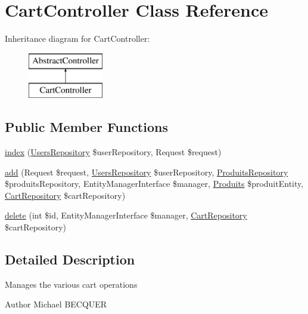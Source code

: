 \hypertarget{class_app_1_1_controller_1_1_cart_controller}{}\section{Cart\+Controller Class Reference}
\label{class_app_1_1_controller_1_1_cart_controller}
Inheritance diagram for Cart\+Controller\+:\begin{figure}[H]
\begin{center}
\leavevmode
\includegraphics[height=2.000000cm]{class_app_1_1_controller_1_1_cart_controller}
\end{center}
\end{figure}
\subsection*{Public Member Functions}
\begin{DoxyCompactItemize}
\item 
\mbox{\hyperlink{class_app_1_1_controller_1_1_cart_controller_acb4819cf06207b3c628edfa1a5af6a6f}{index}} (\mbox{\hyperlink{class_app_1_1_repository_1_1_users_repository}{Users\+Repository}} \$user\+Repository, Request \$request)
\item 
\mbox{\hyperlink{class_app_1_1_controller_1_1_cart_controller_ac217678855013811414d24f84ad9b57b}{add}} (Request \$request, \mbox{\hyperlink{class_app_1_1_repository_1_1_users_repository}{Users\+Repository}} \$user\+Repository, \mbox{\hyperlink{class_app_1_1_repository_1_1_produits_repository}{Produits\+Repository}} \$produits\+Repository, Entity\+Manager\+Interface \$manager, \mbox{\hyperlink{class_app_1_1_entity_1_1_produits}{Produits}} \$produit\+Entity, \mbox{\hyperlink{class_app_1_1_repository_1_1_cart_repository}{Cart\+Repository}} \$cart\+Repository)
\item 
\mbox{\hyperlink{class_app_1_1_controller_1_1_cart_controller_a0a4f4fa16921c0100dcd9d64104eafdb}{delete}} (int \$id, Entity\+Manager\+Interface \$manager, \mbox{\hyperlink{class_app_1_1_repository_1_1_cart_repository}{Cart\+Repository}} \$cart\+Repository)
\end{DoxyCompactItemize}


\subsection{Detailed Description}
Manages the various cart operations \begin{DoxyAuthor}{Author}
Michael B\+E\+C\+Q\+U\+ER 
\end{DoxyAuthor}


